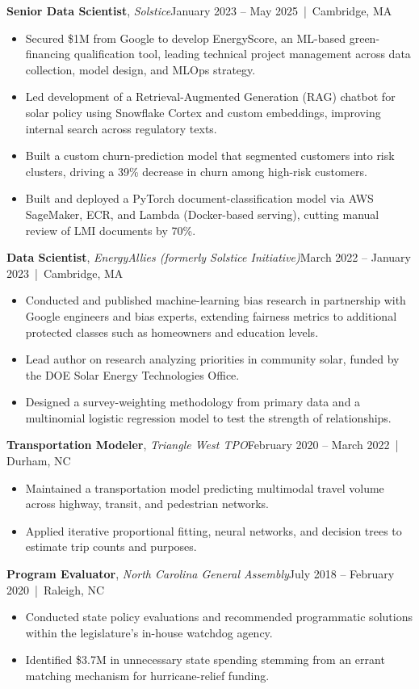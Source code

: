 \documentclass[11pt]{article}
\newcommand{\entry}[4]{%
  \textbf{#1}, \textit{#3}\hfill #2 \,|\, #4\par%
}
\begin{document}
\entry{Senior Data Scientist}{January 2023 -- May 2025}{Solstice}{Cambridge, MA}
\begin{itemize}
  \item Secured \$1M from Google to develop EnergyScore, an ML-based green-financing qualification tool, leading technical project management across data collection, model design, and MLOps strategy.
  \item Led development of a Retrieval-Augmented Generation (RAG) chatbot for solar policy using Snowflake Cortex and custom embeddings, improving internal search across regulatory texts.
  \item Built a custom churn-prediction model that segmented customers into risk clusters, driving a 39\% decrease in churn among high-risk customers.
  \item Built and deployed a PyTorch document-classification model via AWS SageMaker, ECR, and Lambda (Docker-based serving), cutting manual review of LMI documents by 70\%.
\end{itemize}

\entry{Data Scientist}{March 2022 -- January 2023}{EnergyAllies (formerly Solstice Initiative)}{Cambridge, MA}
\begin{itemize}
  \item Conducted and published machine-learning bias research in partnership with Google engineers and bias experts, extending fairness metrics to additional protected classes such as homeowners and education levels.
  \item Lead author on research analyzing priorities in community solar, funded by the DOE Solar Energy Technologies Office.
  \item Designed a survey-weighting methodology from primary data and a multinomial logistic regression model to test the strength of relationships.
\end{itemize}

\entry{Transportation Modeler}{February 2020 -- March 2022}{Triangle West TPO}{Durham, NC}
\begin{itemize}
  \item Maintained a transportation model predicting multimodal travel volume across highway, transit, and pedestrian networks.
  \item Applied iterative proportional fitting, neural networks, and decision trees to estimate trip counts and purposes.
\end{itemize}

\entry{Program Evaluator}{July 2018 -- February 2020}{North Carolina General Assembly}{Raleigh, NC}
\begin{itemize}
  \item Conducted state policy evaluations and recommended programmatic solutions within the legislature's in-house watchdog agency.
  \item Identified \$3.7M in unnecessary state spending stemming from an errant matching mechanism for hurricane-relief funding.
\end{itemize}
\end{document}
